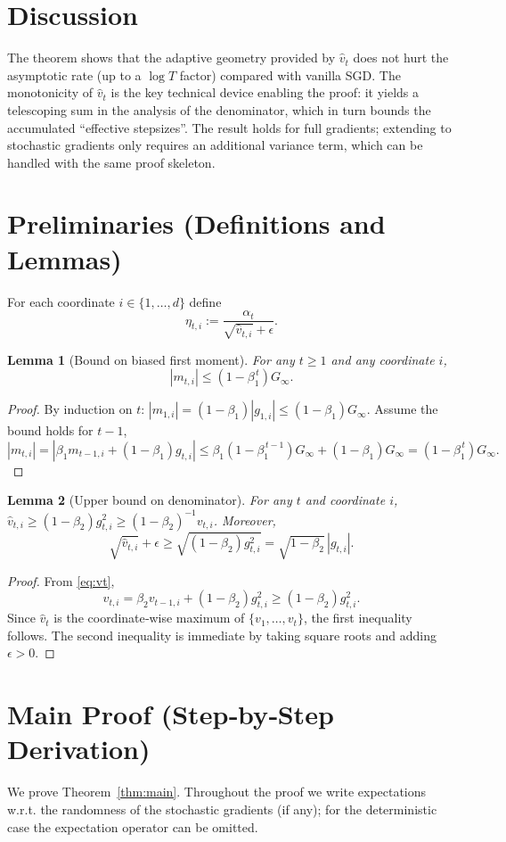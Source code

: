 \documentclass{article}
\newtheorem{lemma}{Lemma}
\begin{document}
\section*{Discussion}
The theorem shows that the adaptive geometry provided by $\hat v_t$ does not hurt the asymptotic rate (up to a $\log T$ factor) compared with vanilla SGD. The monotonicity of $\hat v_t$ is the key technical device enabling the proof: it yields a telescoping sum in the analysis of the denominator, which in turn bounds the accumulated “effective stepsizes”. The result holds for full gradients; extending to stochastic gradients only requires an additional variance term, which can be handled with the same proof skeleton.

\section*{Preliminaries (Definitions and Lemmas)}
\begin{definition}
For each coordinate $i\in\{1,\dots,d\}$ define
\[
\eta_{t,i}:=\frac{\alpha_t}{\sqrt{\hat v_{t,i}}+\epsilon}.
\]
\end{definition}
\begin{lemma}[Bound on biased first moment]\label{lem:mt}
For any $t\ge 1$ and any coordinate $i$,
\[
|m_{t,i}|\le (1-\beta_1^{\,t})G_\infty .
\]
\end{lemma}
\begin{proof}
By induction on $t$: $|m_{1,i}|=(1-\beta_1)|g_{1,i}|\le(1-\beta_1)G_\infty$. Assume the bound holds for $t-1$,
\[
|m_{t,i}|=|\beta_1 m_{t-1,i}+(1-\beta_1)g_{t,i}|
\le \beta_1(1-\beta_1^{\,t-1})G_\infty+(1-\beta_1)G_\infty
= (1-\beta_1^{\,t})G_\infty .
\]
\end{proof}
\begin{lemma}[Upper bound on denominator]\label{lem:vt}
For any $t$ and coordinate $i$, $\hat v_{t,i}\ge (1-\beta_2)g_{t,i}^2\ge (1-\beta_2)^{-1}v_{t,i}$. Moreover,
\[
\sqrt{\hat v_{t,i}}+\epsilon \ge \sqrt{(1-\beta_2)g_{t,i}^2} = \sqrt{1-\beta_2}\,|g_{t,i}|.
\]
\end{lemma}
\begin{proof}
From \eqref{eq:vt},
\[
v_{t,i}= \beta_2 v_{t-1,i}+(1-\beta_2)g_{t,i}^2\ge (1-\beta_2)g_{t,i}^2.
\]
Since $\hat v_t$ is the coordinate‑wise maximum of $\{v_1,\dots,v_t\}$, the first inequality follows. The second inequality is immediate by taking square roots and adding $\epsilon>0$.
\end{proof}

\section*{Main Proof (Step‑by‑Step Derivation)}
We prove Theorem~\ref{thm:main}. Throughout the proof we write expectations w.r.t. the randomness of the stochastic gradients (if any); for the deterministic case the expectation operator can be omitted.
\end{document}

